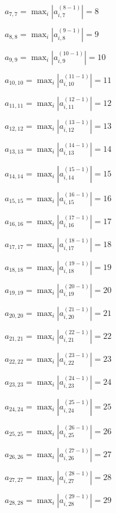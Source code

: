 \documentclass[a4paper,12pt]{article}
\begin{document}
$a _{ 7, 7 } =  \max _i |a _{ i, 7 } ^{ (8 - 1) } | = 8$

$a _{ 8, 8 } =  \max _i |a _{ i, 8 } ^{ (9 - 1) } | = 9$

$a _{ 9, 9 } =  \max _i |a _{ i, 9 } ^{ (10 - 1) } | = 10$

$a _{ 10, 10 } =  \max _i |a _{ i, 10 } ^{ (11 - 1) } | = 11$

$a _{ 11, 11 } =  \max _i |a _{ i, 11 } ^{ (12 - 1) } | = 12$

$a _{ 12, 12 } =  \max _i |a _{ i, 12 } ^{ (13 - 1) } | = 13$

$a _{ 13, 13 } =  \max _i |a _{ i, 13 } ^{ (14 - 1) } | = 14$

$a _{ 14, 14 } =  \max _i |a _{ i, 14 } ^{ (15 - 1) } | = 15$

$a _{ 15, 15 } =  \max _i |a _{ i, 15 } ^{ (16 - 1) } | = 16$

$a _{ 16, 16 } =  \max _i |a _{ i, 16 } ^{ (17 - 1) } | = 17$

$a _{ 17, 17 } =  \max _i |a _{ i, 17 } ^{ (18 - 1) } | = 18$

$a _{ 18, 18 } =  \max _i |a _{ i, 18 } ^{ (19 - 1) } | = 19$

$a _{ 19, 19 } =  \max _i |a _{ i, 19 } ^{ (20 - 1) } | = 20$

$a _{ 20, 20 } =  \max _i |a _{ i, 20 } ^{ (21 - 1) } | = 21$

$a _{ 21, 21 } =  \max _i |a _{ i, 21 } ^{ (22 - 1) } | = 22$

$a _{ 22, 22 } =  \max _i |a _{ i, 22 } ^{ (23 - 1) } | = 23$

$a _{ 23, 23 } =  \max _i |a _{ i, 23 } ^{ (24 - 1) } | = 24$

$a _{ 24, 24 } =  \max _i |a _{ i, 24 } ^{ (25 - 1) } | = 25$

$a _{ 25, 25 } =  \max _i |a _{ i, 25 } ^{ (26 - 1) } | = 26$

$a _{ 26, 26 } =  \max _i |a _{ i, 26 } ^{ (27 - 1) } | = 27$

$a _{ 27, 27 } =  \max _i |a _{ i, 27 } ^{ (28 - 1) } | = 28$

$a _{ 28, 28 } =  \max _i |a _{ i, 28 } ^{ (29 - 1) } | = 29$
\end{document}
